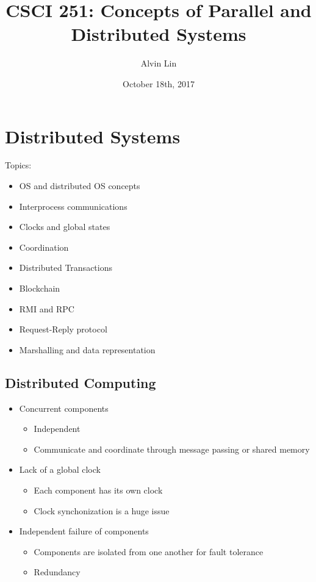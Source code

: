 \documentclass[letterpaper, 12pt]{math}
\title{CSCI 251: Concepts of Parallel and Distributed Systems}
\author{Alvin Lin}
\date{October 18th, 2017}
\begin{document}
\maketitle

\section*{Distributed Systems}
Topics:
\begin{itemize}
  \item OS and distributed OS concepts
  \item Interprocess communications
  \item Clocks and global states
  \item Coordination
  \item Distributed Transactions
  \item Blockchain
  \item RMI and RPC
  \item Request-Reply protocol
  \item Marshalling and data representation
\end{itemize}

\subsection*{Distributed Computing}
\begin{itemize}
  \item Concurrent components
  \begin{itemize}
    \item Independent
    \item Communicate and coordinate through message passing or shared memory
  \end{itemize}
  \item Lack of a global clock
  \begin{itemize}
    \item Each component has its own clock
    \item Clock synchonization is a huge issue
  \end{itemize}
  \item Independent failure of components
  \begin{itemize}
    \item Components are isolated from one another for fault tolerance
    \item Redundancy
  \end{itemize}
\end{itemize}
\end{document}
